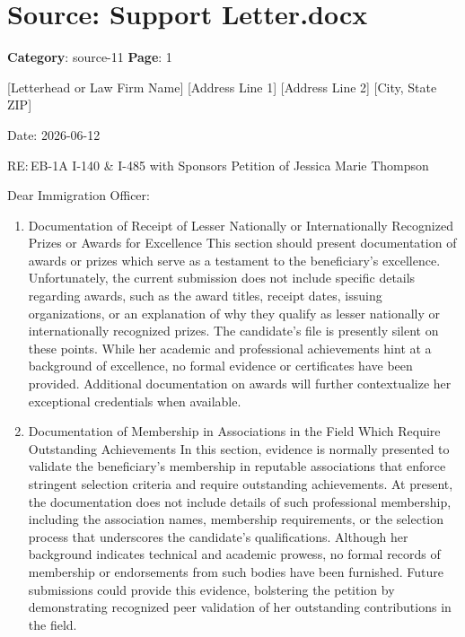 \section*{Source: Support Letter.docx}
\textbf{Category}: source-11
\textbf{Page}: 1

[Letterhead or Law Firm Name]
[Address Line 1]
[Address Line 2]
[City, State ZIP]

Date: 2026-06-12

RE: EB-1A I-140 \& I-485 with Sponsors Petition of Jessica Marie Thompson

Dear Immigration Officer:

\begin{enumerate}

\item Documentation of Receipt of Lesser Nationally or Internationally Recognized Prizes or Awards for Excellence
This section should present documentation of awards or prizes which serve as a testament to the beneficiary’s excellence. Unfortunately, the current submission does not include specific details regarding awards, such as the award titles, receipt dates, issuing organizations, or an explanation of why they qualify as lesser nationally or internationally recognized prizes. The candidate’s file is presently silent on these points. While her academic and professional achievements hint at a background of excellence, no formal evidence or certificates have been provided. Additional documentation on awards will further contextualize her exceptional credentials when available.

\item Documentation of Membership in Associations in the Field Which Require Outstanding Achievements
In this section, evidence is normally presented to validate the beneficiary’s membership in reputable associations that enforce stringent selection criteria and require outstanding achievements. At present, the documentation does not include details of such professional membership, including the association names, membership requirements, or the selection process that underscores the candidate’s qualifications. Although her background indicates technical and academic prowess, no formal records of membership or endorsements from such bodies have been furnished. Future submissions could provide this evidence, bolstering the petition by demonstrating recognized peer validation of her outstanding contributions in the field.


\end{enumerate}
